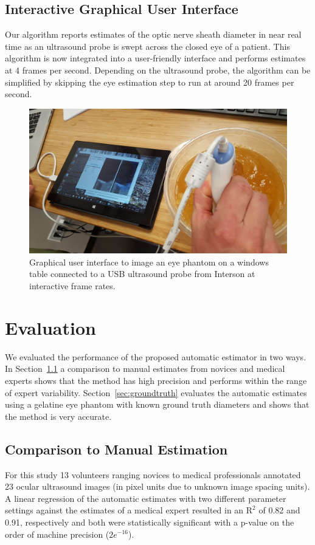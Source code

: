 \documentclass{llncs}
\begin{document}
\subsection{Interactive Graphical User Interface}
\label{sec:gui}
Our algorithm reports estimates of the optic nerve sheath diameter in near real
time as an ultrasound probe is swept across the closed eye of a patient.  This
algorithm is now integrated into a user-friendly interface and performs
estimates at 4 frames per second. Depending on the ultrasound probe, the
algorithm can be simplified by skipping the eye estimation step to run at around
20 frames per second. 
\begin{figure}
\centering
\includegraphics[width=0.7\linewidth]{gui.jpg} 
\caption{
\label{fig:gui}
Graphical user interface to image an eye phantom on a windows table connected to
a USB ultrasound probe from Interson at interactive frame rates. 
}
\end{figure}


\section{Evaluation}
We evaluated the performance of the proposed automatic estimator in two ways.
In Section~\ref{sec:manual} a comparison to manual estimates from novices and
medical experts shows that the method has high precision and performs within the
range of expert variability. Section~\ref{sec:groundtruth} evaluates the
automatic estimates using a gelatine eye phantom with known ground truth
diameters and shows that the method is very accurate. 

\subsection{Comparison to Manual Estimation}
\label{sec:manual}
For this study 13 volunteers ranging novices to medical professionals annotated
23 ocular ultrasound images (in pixel units due to unknown image spacing units).
A linear regression of the automatic estimates with two different parameter
settings against the estimates of a medical expert resulted in an $\mathrm{R}^2$
of 0.82 and 0.91, respectively and both were  statistically significant with a
p-value on the order of machine precision ($2e^{-16}$).
\end{document}
